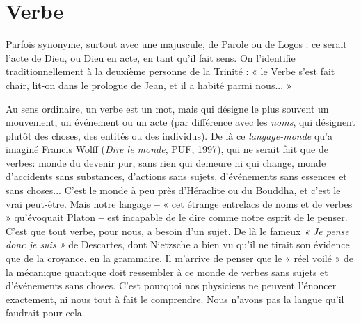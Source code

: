 \section{Verbe}
Parfois synonyme, surtout avec une majuscule, de Parole ou de Logos :
ce serait l’acte de Dieu, ou Dieu en acte, en tant qu’il fait sens. On
l’identifie traditionnellement à la deuxième personne de la Trinité : « le Verbe
s’est fait chair, lit-on dans le prologue de Jean, et il a habité parmi nous... »

Au sens ordinaire, un verbe est un mot, mais qui désigne le plus souvent un
mouvement, un événement ou un acte (par différence avec les {\it noms}, qui
désignent plutôt des choses, des entités ou des individus). De là ce {\it langage-monde} 
qu'a imaginé Francis Wolff ({\it Dire le monde}, PUF, 1997), qui ne serait
fait que de verbes: monde du devenir pur, sans rien qui demeure ni qui
change, monde d’accidents sans substances, d’actions sans sujets, d'événements
sans essences et sans choses... C’est le monde à peu près d'Héraclite ou du
Bouddha, et c’est le vrai peut-être. Mais notre langage {\bf --} « cet étrange entrelacs
de noms et de verbes » qu’évoquait Platon {\bf --} est incapable de le dire comme
notre esprit de le penser. C’est que tout verbe, pour nous, a besoin d’un sujet.
De là le fameux {\it « Je pense donc je suis »} de Descartes, dont Nietzsche a bien vu
qu'il ne tirait son évidence que de la croyance. en la grammaire. Il m'arrive
de penser que le « réel voilé » de la mécanique quantique doit ressembler à ce
monde de verbes sans sujets et d’événements sans choses. C’est pourquoi nos
physiciens ne peuvent l’énoncer exactement, ni nous tout à fait le comprendre.
Nous n'avons pas la langue qu’il faudrait pour cela.

